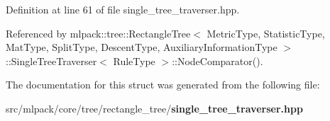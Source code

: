 Definition at line 61 of file single\+\_\+tree\+\_\+traverser.\+hpp.



Referenced by mlpack\+::tree\+::\+Rectangle\+Tree$<$ Metric\+Type, Statistic\+Type, Mat\+Type, Split\+Type, Descent\+Type, Auxiliary\+Information\+Type $>$\+::\+Single\+Tree\+Traverser$<$ Rule\+Type $>$\+::\+Node\+Comparator().



The documentation for this struct was generated from the following file\+:\begin{DoxyCompactItemize}
\item 
src/mlpack/core/tree/rectangle\+\_\+tree/{\bf single\+\_\+tree\+\_\+traverser.\+hpp}\end{DoxyCompactItemize}
